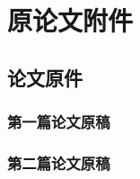 \documentclass[lang=cn,zihao=-4,twoside,fontset=none]{textbook}
\begin{document}
\appendix
\part{原论文附件}
\chapter{论文原件}

\section{第一篇论文原稿}
\newpage
\section{第二篇论文原稿}
%
\printbibliography[heading=bibintoc]
\end{document}
